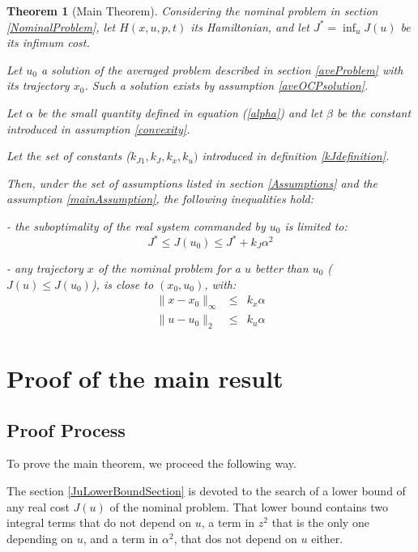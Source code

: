 \documentclass[a4paper,10pt]{article}
\newtheorem{theorem}{Theorem}
\begin{document}
\begin{theorem}[Main Theorem]\label{MainTheorem}
    Considering the nominal problem in section \ref{NominalProblem}, 
    let $H(x,u,p,t)$ its Hamiltonian, and let $J^{*}= \inf_{u}J(u)$ be 
    its infimum cost.
    
    Let $u_{0}$ a solution of the averaged problem 
    described in section \ref{aveProblem} with its trajectory $x_{0}$. Such a solution exists 
    by assumption \ref{aveOCPsolution}.
    
    Let $\alpha$ be the small quantity defined in equation 
    (\ref{alpha}) and let $\beta$ be the constant introduced in 
    assumption \ref{convexity}.
    
    Let  the set of constants ($k_{J1}, k_{J}, k_{x}, k_{u})$ 
   introduced in definition \ref{kJdefinition}.
    
   Then, under the set of assumptions listed in section \ref{Assumptions} 
   and the assumption \ref{mainAssumption}, the following 
   inequalities hold:
   
   - the suboptimality of the real system commanded by $u_{0}$ is limited 
   to:
   \begin{equation}
       J^{*} \leq J(u_{0}) \leq J^{*} + k_{J} \alpha^{2}
       \label{suboptimality}
   \end{equation}
   
   - any trajectory $x$ of the nominal problem 
   for a $u$ better than $u_{0}$ ($J(u) \leq J(u_{0})$), is close to 
   $(x_{0},u_{0})$, with:
   \begin{eqnarray}
       \|x-x_{0}\|_{\infty} & \leq  & k_{x} \alpha
       \label{closeTrajectory}\\
       \|u-u_{0}\|_{2} & \leq & k_{u} \alpha
       \label{closeControl}
   \end{eqnarray}
\end{theorem}


\section{Proof of the main result}\label{proof}
\subsection{Proof Process}
To prove the main theorem, we proceed the following way.

The section \ref{JuLowerBoundSection} is devoted to the search of a 
lower bound of any real cost $J(u)$ of the nominal problem. That 
lower bound contains two integral terms that do not depend on $u$, a 
term in $z^{2}$ that is the only one depending on $u$, and a term in 
$\alpha^{2}$, that dos not depend on $u$ either.
\end{document}
